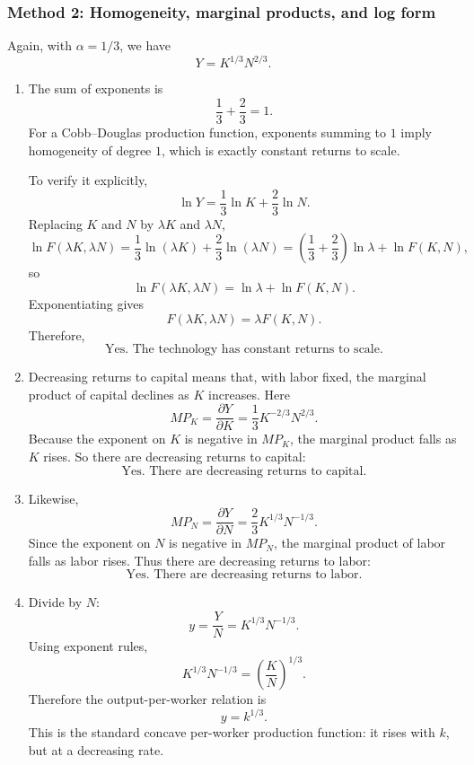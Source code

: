 \documentclass[12pt]{article}
\begin{document}
\subsubsection{Method 2: Homogeneity, marginal products, and log form}
Again, with \(\alpha=1/3\), we have
\[
Y=K^{1/3}N^{2/3}.
\]

\begin{enumerate}[label=(\alph*)]
    \item
    The sum of exponents is
    \[
    \frac{1}{3}+\frac{2}{3}=1.
    \]
    For a Cobb--Douglas production function, exponents summing to \(1\) imply homogeneity of degree \(1\), which is exactly constant returns to scale.

    To verify it explicitly,
    \[
    \ln Y=\frac{1}{3}\ln K+\frac{2}{3}\ln N.
    \]
    Replacing \(K\) and \(N\) by \(\lambda K\) and \(\lambda N\),
    \[
    \ln F(\lambda K,\lambda N)
    =
    \frac{1}{3}\ln(\lambda K)+\frac{2}{3}\ln(\lambda N)
    =
    \left(\frac{1}{3}+\frac{2}{3}\right)\ln\lambda + \ln F(K,N),
    \]
    so
    \[
    \ln F(\lambda K,\lambda N)=\ln \lambda + \ln F(K,N).
    \]
    Exponentiating gives
    \[
    F(\lambda K,\lambda N)=\lambda F(K,N).
    \]
    Therefore,
    \[
    \boxed{\text{Yes. The technology has constant returns to scale.}}
    \]

    \item
    Decreasing returns to capital means that, with labor fixed, the marginal product of capital declines as \(K\) increases. Here
    \[
    MP_K=\frac{\partial Y}{\partial K}
    =\frac{1}{3}K^{-2/3}N^{2/3}.
    \]
    Because the exponent on \(K\) is negative in \(MP_K\), the marginal product falls as \(K\) rises. So there are decreasing returns to capital:
    \[
    \boxed{\text{Yes. There are decreasing returns to capital.}}
    \]

    \item
    Likewise,
    \[
    MP_N=\frac{\partial Y}{\partial N}
    =\frac{2}{3}K^{1/3}N^{-1/3}.
    \]
    Since the exponent on \(N\) is negative in \(MP_N\), the marginal product of labor falls as labor rises. Thus there are decreasing returns to labor:
    \[
    \boxed{\text{Yes. There are decreasing returns to labor.}}
    \]

    \item
    Divide by \(N\):
    \[
    y=\frac{Y}{N}=K^{1/3}N^{-1/3}.
    \]
    Using exponent rules,
    \[
    K^{1/3}N^{-1/3}=\left(\frac{K}{N}\right)^{1/3}.
    \]
    Therefore the output-per-worker relation is
    \[
    \boxed{y=k^{1/3}.}
    \]
    This is the standard concave per-worker production function: it rises with \(k\), but at a decreasing rate.
\end{enumerate}
\end{document}
